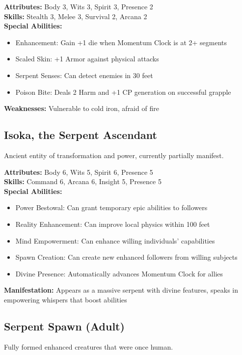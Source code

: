 \documentclass[12pt,twoside]{article}
\begin{document}
\textbf{Attributes:} Body 3, Wits 3, Spirit 3, Presence 2 \\
\textbf{Skills:} Stealth 3, Melee 3, Survival 2, Arcana 2 \\
\textbf{Special Abilities:}
\begin{itemize}
  \item Enhancement: Gain +1 die when Momentum Clock is at 2+ segments
  \item Scaled Skin: +1 Armor against physical attacks
  \item Serpent Senses: Can detect enemies in 30 feet
  \item Poison Bite: Deals 2 Harm and +1 CP generation on successful grapple
\end{itemize}
\textbf{Weaknesses:} Vulnerable to cold iron, afraid of fire

\subsection{Isoka, the Serpent Ascendant}

Ancient entity of transformation and power, currently partially manifest.

\textbf{Attributes:} Body 6, Wits 5, Spirit 6, Presence 5 \\
\textbf{Skills:} Command 6, Arcana 6, Insight 5, Presence 5 \\
\textbf{Special Abilities:}
\begin{itemize}
  \item Power Bestowal: Can grant temporary epic abilities to followers
  \item Reality Enhancement: Can improve local physics within 100 feet
  \item Mind Empowerment: Can enhance willing individuals' capabilities
  \item Spawn Creation: Can create new enhanced followers from willing subjects
  \item Divine Presence: Automatically advances Momentum Clock for allies
\end{itemize}
\textbf{Manifestation:} Appears as a massive serpent with divine features, speaks in empowering whispers that boost abilities

\subsection{Serpent Spawn (Adult)}

Fully formed enhanced creatures that were once human.
\end{document}
